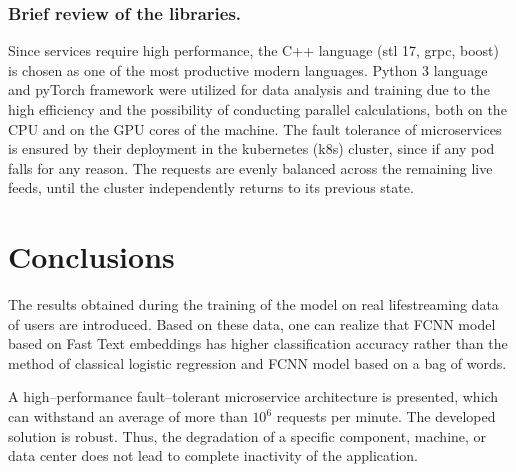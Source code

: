 \documentclass[a4paper]{jpconf}
\begin{document}
\subsubsection*{Brief review of the libraries.}
Since services require high performance, the C++ language (stl 17, grpc, boost) is chosen as one of the most productive modern languages. Python 3 language and pyTorch framework were utilized for data analysis and training due to the high efficiency and the possibility of conducting parallel calculations, both on the CPU and on the GPU cores of the machine.
The fault tolerance of microservices is ensured by their deployment in the kubernetes (k8s) cluster, since if any pod falls for any reason. The requests are evenly balanced across the remaining live feeds, until the cluster independently returns to its previous state.

\section{Conclusions}
The results obtained during the training of the model on real lifestreaming data of users are introduced. Based on these data, one can realize that FCNN model based on Fast Text embeddings has higher classification accuracy rather than the method of classical logistic regression and FCNN  model based on a bag of words.

A high--performance fault--tolerant microservice architecture is presented, which can withstand an average of more than $10^6$ requests per minute. The developed solution is robust. Thus, the degradation of a specific component, machine, or data center does not lead to complete inactivity of the application.
\end{document}
